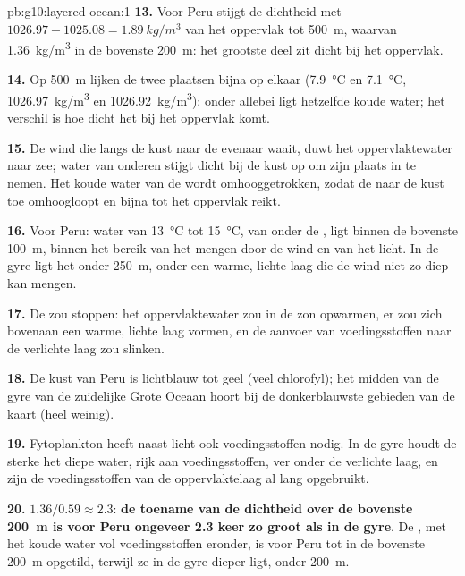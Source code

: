 \begin{solution}{pb:g10:layered-ocean:1}
\textbf{13.} Voor Peru stijgt de dichtheid met $1026.97 - 1025.08 =
\qty{1.89}{kg/m^3}$ van het oppervlak tot \qty{500}{m}, waarvan
\qty{1.36}{kg/m^3} in de bovenste \qty{200}{m}: het grootste deel zit dicht bij
het oppervlak.

\textbf{14.} Op \qty{500}{m} lijken de twee plaatsen bijna op elkaar
(\qty{7.9}{\degreeCelsius} en \qty{7.1}{\degreeCelsius},
\qty{1026.97}{kg/m^3} en \qty{1026.92}{kg/m^3}): onder allebei ligt hetzelfde
koude water; het verschil is hoe dicht het bij het oppervlak komt.

\textbf{15.} De wind die langs de kust naar de evenaar waait, duwt het
oppervlaktewater naar zee; water van onderen stijgt dicht bij de kust op om zijn
plaats in te nemen. Het koude water van de  wordt omhooggetrokken,
zodat de  naar de kust toe omhoogloopt en bijna tot het oppervlak
reikt.

\textbf{16.} Voor Peru: water van \qty{13}{\degreeCelsius} tot
\qty{15}{\degreeCelsius}, van onder de , ligt binnen de bovenste
\qty{100}{m}, binnen het bereik van het mengen door de wind en van het licht. In
de gyre ligt het onder \qty{250}{m}, onder een warme, lichte laag die de wind
niet zo diep kan mengen.

\textbf{17.} De  zou stoppen: het oppervlaktewater zou in de zon
opwarmen, er zou zich bovenaan een warme, lichte laag vormen, en de aanvoer van
voedingsstoffen naar de verlichte laag zou slinken.

\textbf{18.} De kust van Peru is lichtblauw tot geel (veel chlorofyl); het
midden van de gyre van de zuidelijke Grote Oceaan hoort bij de donkerblauwste
gebieden van de kaart (heel weinig).

\textbf{19.} Fytoplankton heeft naast licht ook voedingsstoffen nodig. In de gyre
houdt de sterke  het diepe water, rijk aan voedingsstoffen, ver onder
de verlichte laag, en zijn de voedingsstoffen van de oppervlaktelaag al lang
opgebruikt.

\textbf{20.} $1.36/0.59 \approx 2.3$: \textbf{de toename van de dichtheid over
de bovenste \qty{200}{m} is voor Peru ongeveer 2.3 keer zo groot als in de
gyre}. De , met het koude water vol voedingsstoffen eronder, is voor
Peru tot in de bovenste \qty{200}{m} opgetild, terwijl ze in de gyre dieper ligt,
onder \qty{200}{m}.
\end{solution}
